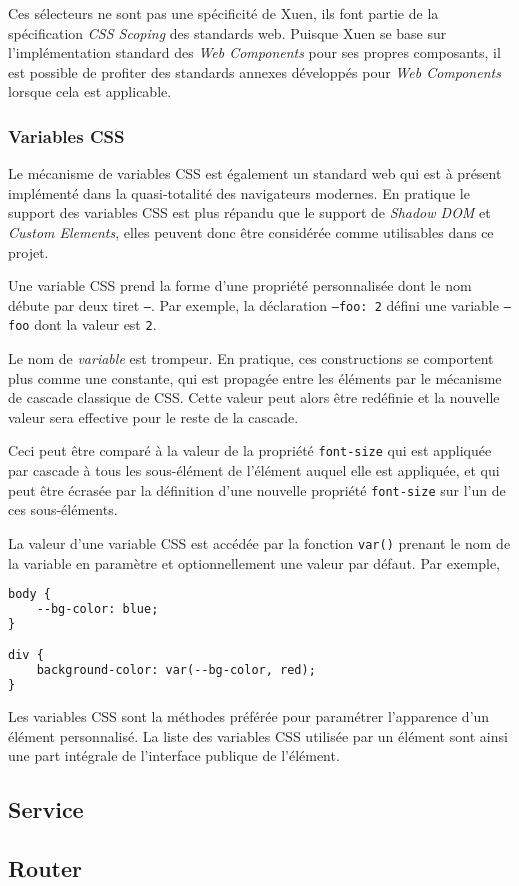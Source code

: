 Ces sélecteurs ne sont pas une spécificité de Xuen, ils font partie de la spécification \emph{CSS Scoping} des standards web. Puisque Xuen se base sur l'implémentation standard des \emph{Web Components} pour ses propres composants, il est possible de profiter des standards annexes développés pour \emph{Web Components} lorsque cela est applicable.

\subsubsection{Variables CSS}
Le mécanisme de variables CSS est également un standard web qui est à présent implémenté dans la quasi-totalité des navigateurs modernes. En pratique le support des variables CSS est plus répandu que le support de \emph{Shadow DOM} et \emph{Custom Elements}, elles peuvent donc être considérée comme utilisables dans ce projet.

Une variable CSS prend la forme d'une propriété personnalisée dont le nom débute par deux tiret \texttt{--}. Par exemple, la déclaration \texttt{--foo: 2} défini une variable \texttt{--foo} dont la valeur est \texttt{2}.

Le nom de \emph{variable} est trompeur. En pratique, ces constructions se comportent plus comme une constante, qui est propagée entre les éléments par le mécanisme de cascade classique de CSS. Cette valeur peut alors être redéfinie et la nouvelle valeur sera effective pour le reste de la cascade.

Ceci peut être comparé à la valeur de la propriété \texttt{font-size} qui est appliquée par cascade à tous les sous-élément de l'élément auquel elle est appliquée, et qui peut être écrasée par la définition d'une nouvelle propriété \texttt{font-size} sur l'un de ces sous-éléments.

La valeur d'une variable CSS est accédée par la fonction \texttt{var()} prenant le nom de la variable en paramètre et optionnellement une valeur par défaut. Par exemple,
\begin{lstlisting}[language=HTML]
body {
	--bg-color: blue;
}

div {
	background-color: var(--bg-color, red);
}
\end{lstlisting}

Les variables CSS sont la méthodes préférée pour paramétrer l'apparence d'un élément personnalisé. La liste des variables CSS utilisée par un élément sont ainsi une part intégrale de l'interface publique de l'élément.

\subsection{Service}

\subsection{Router}
